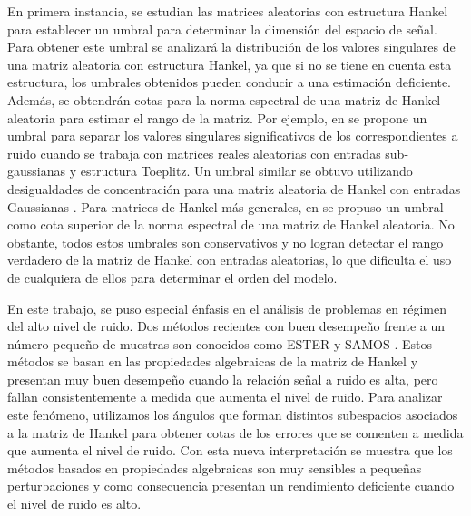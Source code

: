 En primera instancia, se estudian las matrices aleatorias con estructura Hankel para establecer un umbral para determinar la dimensión del espacio de señal.  Para obtener este umbral se analizará la distribución de los valores singulares de una matriz aleatoria con estructura Hankel, ya que si no se tiene en cuenta esta estructura, los umbrales obtenidos pueden conducir a una estimación deficiente. Además, se obtendrán cotas para la norma espectral de una matriz de Hankel aleatoria para estimar el rango de la matriz. Por ejemplo, en \cite{Qiao2020} se propone un umbral para separar los valores singulares significativos de los correspondientes a ruido cuando se trabaja con matrices reales aleatorias con entradas sub-gaussianas y estructura Toeplitz. Un umbral similar se obtuvo utilizando desigualdades de concentración para una matriz aleatoria de Hankel con entradas Gaussianas \cite{tropp2015}. Para matrices de Hankel más generales, en \cite{Hokanson2020} se propuso un umbral como cota superior de la norma espectral de una matriz de Hankel aleatoria. No obstante, todos estos umbrales son conservativos y no logran detectar el rango verdadero de la matriz de Hankel con entradas aleatorias, lo que dificulta el uso de cualquiera de ellos para determinar el orden del modelo. 

En este trabajo, se puso especial énfasis en el análisis de problemas en régimen del alto nivel de ruido. Dos métodos recientes con buen desempeño frente a un número pequeño de muestras son conocidos como ESTER \cite{Badeau2006} y SAMOS \cite{Papy2007}. Estos métodos se basan en las propiedades algebraicas de la matriz de Hankel y presentan muy buen desempeño cuando la relación señal a ruido es alta, pero fallan consistentemente a medida que aumenta el nivel de ruido. Para analizar este fenómeno, utilizamos los ángulos que forman distintos subespacios asociados a la matriz de Hankel para obtener  cotas de los errores que se comenten a medida que aumenta el nivel de ruido. Con esta nueva interpretación se muestra que los métodos basados en propiedades algebraicas son muy sensibles a pequeñas perturbaciones y como consecuencia presentan un rendimiento deficiente cuando el nivel de ruido es alto.
 
